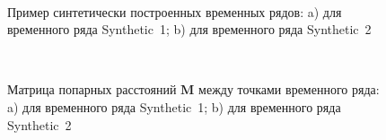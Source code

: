 \begin{figure}[h!t]\center
{}
\\
\caption{Пример синтетически построенных временных рядов: a) для временного ряда Synthetic~1; b) для временного ряда Synthetic~2}
\label{fig_synthetic_series}
\end{figure}

\begin{figure}[h!t]\center
{}
\\
\caption{Матрица попарных расстояний $\textbf{M}$ между точками временного ряда: a) для временного ряда Synthetic~1; b) для временного ряда Synthetic~2}
\label{fig_synthetic_distance}
\end{figure}

